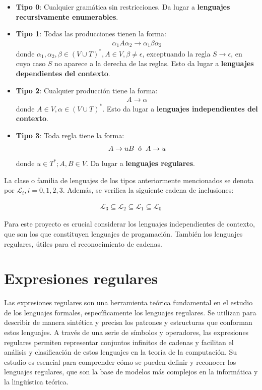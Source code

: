 \begin{itemize}
    \item \textbf{Tipo 0}: Cualquier gramática sin restricciones. Da lugar a \textbf{lenguajes recursivamente enumerables}.
    \item \textbf{Tipo 1}: Todas las producciones tienen la forma:
    \begin{align*}
        \alpha_1 A \alpha_2 \rightarrow \alpha_1 \beta \alpha_2
    \end{align*}
    donde $\alpha_1,\alpha_2,\beta \in (V \cup T)^*, A \in V, \beta \neq \epsilon$, exceptuando la regla $S \rightarrow \epsilon$, en cuyo caso $S$ no aparece a la derecha de las reglas. Esto da lugar a \textbf{lenguajes dependientes del contexto}.
    \item \textbf{Tipo 2}: Cualquier producción tiene la forma:
    \begin{align*}
        A \rightarrow \alpha
    \end{align*}
    donde $A \in V, \alpha \in (V \cup T)^*$. Esto da lugar a \textbf{lenguajes independientes del contexto}.
    \item \textbf{Tipo 3}: Toda regla tiene la forma:
    \begin{align*}
        A \rightarrow uB \hspace{0.2cm} \text{ó} \hspace{0.2cm} A \rightarrow u
    \end{align*}
    donde $u \in T^*; A,B \in V$. Da lugar a \textbf{lenguajes regulares}.
\end{itemize}

La clase o familia de lenguajes de los tipos anteriormente mencionados se denota por $\mathcal{L}_i, i = 0,1,2,3$. Además, se verifica la siguiente cadena de inclusiones:

\begin{align*}
    \mathcal{L}_3 \subseteq \mathcal{L}_2 \subseteq \mathcal{L}_1 \subseteq \mathcal{L}_0
\end{align*}

Para este proyecto es crucial considerar los lenguajes independientes de contexto, que son los que constituyen lenguajes de progamación. También los lenguajes regulares, útiles para el reconocimiento de cadenas.

\section{Expresiones regulares}\label{section:expr}
Las expresiones regulares son una herramienta teórica fundamental en el estudio de los lenguajes formales, específicamente los lenguajes regulares. Se utilizan para describir de manera sintética y precisa los patrones y estructuras que conforman estos lenguajes. A través de una serie de símbolos y operadores, las expresiones regulares permiten representar conjuntos infinitos de cadenas y facilitan el análisis y clasificación de estos lenguajes en la teoría de la computación. Su estudio es esencial para comprender cómo se pueden definir y reconocer los lenguajes regulares, que son la base de modelos más complejos en la informática y la lingüística teórica.

